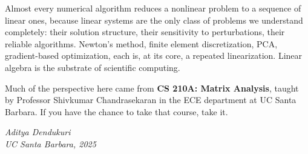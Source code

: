 \documentclass[../readings.tex]{subfiles}
\begin{document}
\medskip

Almost every numerical algorithm reduces a nonlinear problem to a sequence of linear ones, because linear systems are the only class of problems we understand completely: their solution structure, their sensitivity to perturbations, their reliable algorithms. Newton's method, finite element discretization, PCA, gradient-based optimization, each is, at its core, a repeated linearization. Linear algebra is the substrate of scientific computing.

\medskip

Much of the perspective here came from \textbf{CS 210A: Matrix Analysis}, taught by Professor Shivkumar Chandrasekaran in the ECE department at UC Santa Barbara. If you have the chance to take that course, take it.

\vspace{1em}
\begin{flushright}
\textit{Aditya Dendukuri} \\
\textit{UC Santa Barbara, 2025}
\end{flushright}

\newpage
\end{document}

